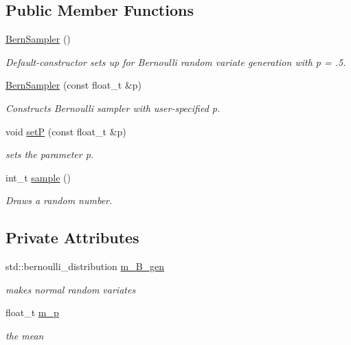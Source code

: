 \subsection*{Public Member Functions}
\begin{DoxyCompactItemize}
\item 
\mbox{\label{classrvsamp_1_1BernSampler_a85b39f1940da6d56a0d7923f684bdb5f}} 
\hyperlink{classrvsamp_1_1BernSampler_a85b39f1940da6d56a0d7923f684bdb5f}{Bern\+Sampler} ()
\begin{DoxyCompactList}\small\item\em Default-\/constructor sets up for Bernoulli random variate generation with p = .5. \end{DoxyCompactList}\item 
\hyperlink{classrvsamp_1_1BernSampler_a18658e918b5bcd5cefdd900ded068686}{Bern\+Sampler} (const float\+\_\+t \&p)
\begin{DoxyCompactList}\small\item\em Constructs Bernoulli sampler with user-\/specified p. \end{DoxyCompactList}\item 
void \hyperlink{classrvsamp_1_1BernSampler_ab61c1b21be5d7422fec4ea95be91c8cc}{setP} (const float\+\_\+t \&p)
\begin{DoxyCompactList}\small\item\em sets the parameter p. \end{DoxyCompactList}\item 
int\+\_\+t \hyperlink{classrvsamp_1_1BernSampler_a2520daff5a896b58073d6756758d1323}{sample} ()
\begin{DoxyCompactList}\small\item\em Draws a random number. \end{DoxyCompactList}\end{DoxyCompactItemize}
\subsection*{Private Attributes}
\begin{DoxyCompactItemize}
\item 
\mbox{\label{classrvsamp_1_1BernSampler_ada54494593944ed1aa4ecdafe3047e93}} 
std\+::bernoulli\+\_\+distribution \hyperlink{classrvsamp_1_1BernSampler_ada54494593944ed1aa4ecdafe3047e93}{m\+\_\+\+B\+\_\+gen}
\begin{DoxyCompactList}\small\item\em makes normal random variates \end{DoxyCompactList}\item 
\mbox{\label{classrvsamp_1_1BernSampler_ae0b9d07a5c37311c21c90b5d0d09ac56}} 
float\+\_\+t \hyperlink{classrvsamp_1_1BernSampler_ae0b9d07a5c37311c21c90b5d0d09ac56}{m\+\_\+p}
\begin{DoxyCompactList}\small\item\em the mean \end{DoxyCompactList}\end{DoxyCompactItemize}
